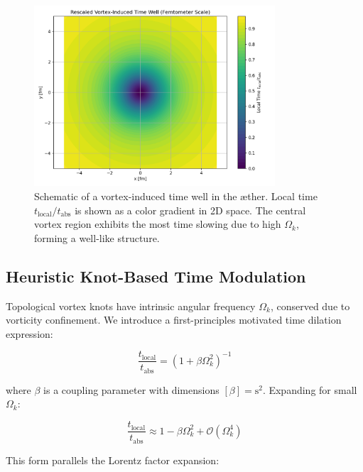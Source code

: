 \begin{figure}[htbp]
    \centering
    \includegraphics[width=0.8\textwidth]{RadialProfileOfLocalTimeDilation_Vortex-Induced_Time_Well}
    \caption{Schematic of a vortex-induced time well in the æther. Local time $t_{\text{local}} / t_{\text{abs}}$ is shown as a color gradient in 2D space. The central vortex region exhibits the most time slowing due to high $\Omega_k$, forming a well-like structure.}
    \label{fig:vortex_time_well}
\end{figure}


\subsection{Heuristic Knot-Based Time Modulation}

Topological vortex knots have intrinsic angular frequency $\Omega_k$, conserved due to vorticity confinement. We introduce a first-principles motivated
time dilation expression:

\begin{equation}
\frac{t_{\text{local}}}{t_{\text{abs}}} = \left(1 + \beta \Omega_k^2 \right)^{-1}\label{eq:angular_time_dilation}
\end{equation}

where $\beta$ is a coupling parameter with dimensions $[\beta] = \text{s}^2$. Expanding for small $\Omega_k$:

\begin{equation}
\frac{t_{\text{local}}}{t_{\text{abs}}} \approx 1 - \beta \Omega_k^2 + \mathcal{O}(\Omega_k^4)\label{eq:angular_time_dilation_expansion}
\end{equation}

This form parallels the Lorentz factor expansion:

